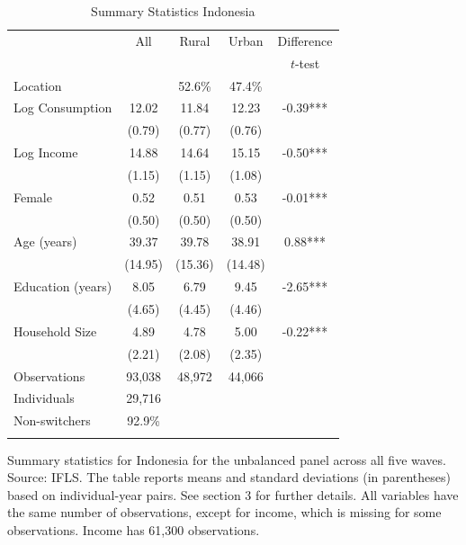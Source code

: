 \begin{table}[t] \centering \caption{Summary Statistics Indonesia}\label{tab:summary_stats_IDN_unb} \begin{threeparttable} \begin{tabular}{l cccc} \toprule
& All & Rural & Urban & Difference \\
 &  &  &  & $t$-test \\
\midrule
Location &  &   52.6\% &   47.4\% &  \\  \addlinespace \addlinespace
Log Consumption & 12.02 & 11.84 & 12.23 & -0.39*** \\
 & (0.79) & (0.77) & (0.76) &  \\  \addlinespace
Log Income & 14.88 & 14.64 & 15.15 & -0.50*** \\
 & (1.15) & (1.15) & (1.08) &  \\  \addlinespace
Female & 0.52 & 0.51 & 0.53 & -0.01*** \\
 & (0.50) & (0.50) & (0.50) &  \\  \addlinespace
Age (years) & 39.37 & 39.78 & 38.91 & 0.88*** \\
 & (14.95) & (15.36) & (14.48) &  \\  \addlinespace
Education (years) & 8.05 & 6.79 & 9.45 & -2.65*** \\
 & (4.65) & (4.45) & (4.46) &  \\  \addlinespace
Household Size & 4.89 & 4.78 & 5.00 & -0.22*** \\
 & (2.21) & (2.08) & (2.35) &  \\  \addlinespace


\cmidrule{2-5}
Observations & 93,038 & 48,972 & 44,066 &  \\  
Individuals & 29,716 &  &  &  \\
Non-switchers &   92.9\% &  &  &  \\  \addlinespace
\bottomrule \end{tabular} \begin{tablenotes}[flushleft] \footnotesize \item{Summary statistics for Indonesia for the unbalanced panel across all five waves. Source: IFLS. The table reports means and standard deviations (in parentheses) based on individual-year pairs. See section 3 for further details. All variables have the same number of observations, except for income, which is missing for some observations. Income has 61,300 observations.} \end{tablenotes} \end{threeparttable} \end{table}